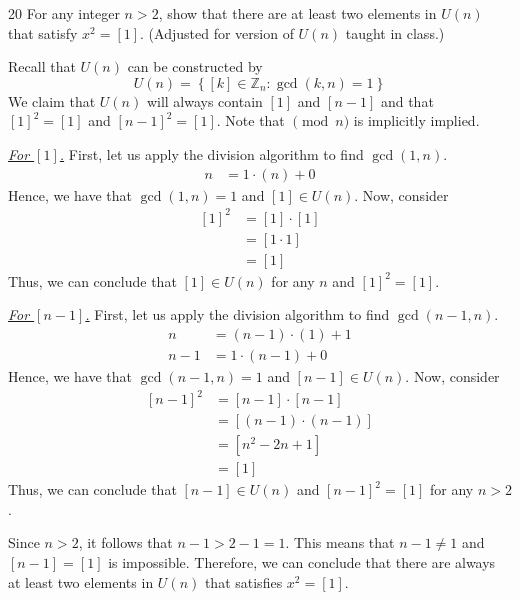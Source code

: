 \begin{hwproblem}
{20}{
    For any integer $n>2$, show that there are at least two elements in $U(n)$ that satisfy $x^2=[1]$. (Adjusted for version of \(U(n)\) taught in class.)
}

Recall that \(U(n)\) can be constructed by
\[
    U(n) = \left\{[k] \in \mathbb{Z}_n : \gcd(k, n) = 1\right\}
\]
We claim that \(U(n)\) will always contain \([1]\) and \([n-1]\) and that \([1]^2 = [1]\) and \([n-1]^2 = [1]\). Note that \(\pmod n\) is implicitly implied.

\underline{\textit{For \([1]\).}} First, let us apply the division algorithm to find \(\gcd(1, n)\).
\[
\begin{aligned}
    n &= 1 \cdot (n) + 0
\end{aligned}
\]
Hence, we have that \(\gcd(1, n) = 1\) and \([1] \in U(n)\). Now, consider
\[
\begin{aligned}
    [1]^2 &= [1] \cdot [1] \\
          &= [1 \cdot 1] \\
          &= [1]
\end{aligned}
\]
Thus, we can conclude that \([1] \in U(n)\) for any \(n\) and \([1]^2 = [1]\).

\underline{\textit{For \([n-1]\).}} First, let us apply the division algorithm to find \(\gcd(n-1, n)\).
\[
\begin{aligned}
    n &= (n-1) \cdot (1) + 1 \\
    n-1 &= 1 \cdot (n-1) + 0
\end{aligned}
\]
Hence, we have that \(\gcd(n-1, n) = 1\) and \([n-1] \in U(n)\). Now, consider
\[
\begin{aligned}
    [n-1]^2 &= [n-1] \cdot [n-1] \\
            &= [(n-1) \cdot (n-1)] \\
            &= [n^2 - 2n + 1] \\
            &= [1]
\end{aligned}
\]
Thus, we can conclude that \([n-1] \in U(n)\) and \([n-1]^2 = [1]\) for any \(n > 2\).

Since \(n > 2\), it follows that \(n-1 > 2-1 = 1\). This means that \(n-1 \neq 1\) and \([n-1] = [1]\) is impossible. Therefore, we can conclude that there are always at least two elements in \(U(n)\) that satisfies \(x^2 = [1]\).
\end{hwproblem}
